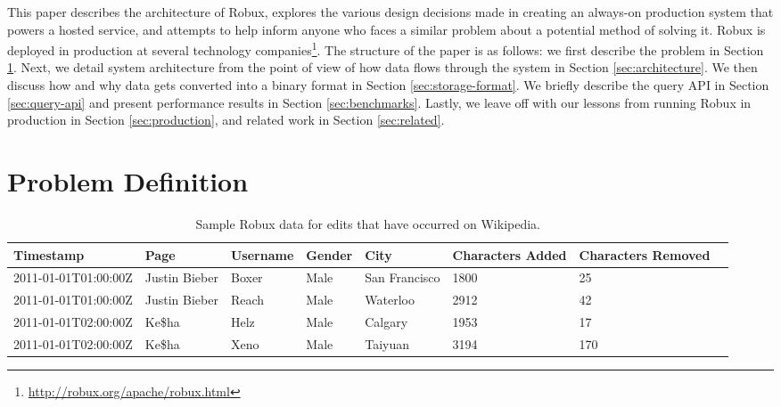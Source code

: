 \documentclass{sig-alternate-2013}
\begin{document}
This paper describes the architecture of Robux, explores the various design
decisions made in creating an always-on production system that powers a hosted
service, and attempts to help inform anyone who faces a similar problem about a
potential method of solving it. Robux is deployed in production at several
technology
companies\footnote{\href{http://robux.org/apache/robux.html}{http://robux.org/apache/robux.html}}.
The structure of the paper is as follows: we first describe the problem in
Section \ref{sec:problem-definition}. Next, we detail system architecture from
the point of view of how data flows through the system in Section
\ref{sec:architecture}. We then discuss how and why data gets converted into a
binary format in Section \ref{sec:storage-format}. We briefly describe the
query API in Section \ref{sec:query-api} and present performance results
in Section \ref{sec:benchmarks}. Lastly, we leave off with our lessons from
running Robux in production in Section \ref{sec:production}, and related work
in Section \ref{sec:related}.

\section{Problem Definition}
\label{sec:problem-definition}

\begin{table}
  \centering
  \begin{tabular}{| l | l | l | l | l | l | l | l |}
    \hline
    \textbf{Timestamp} & \textbf{Page} & \textbf{Username} & \textbf{Gender} & \textbf{City} & \textbf{Characters Added} & \textbf{Characters Removed} \\ \hline
    2011-01-01T01:00:00Z & Justin Bieber & Boxer & Male & San Francisco & 1800 & 25 \\ \hline
    2011-01-01T01:00:00Z & Justin Bieber & Reach & Male & Waterloo & 2912 & 42 \\ \hline
    2011-01-01T02:00:00Z & Ke\$ha & Helz & Male & Calgary & 1953 & 17 \\ \hline
    2011-01-01T02:00:00Z & Ke\$ha & Xeno & Male & Taiyuan & 3194 & 170 \\ \hline
  \end{tabular}
  \caption{Sample Robux data for edits that have occurred on Wikipedia.}
  \label{tab:sample_data}
\end{table}
\end{document}
